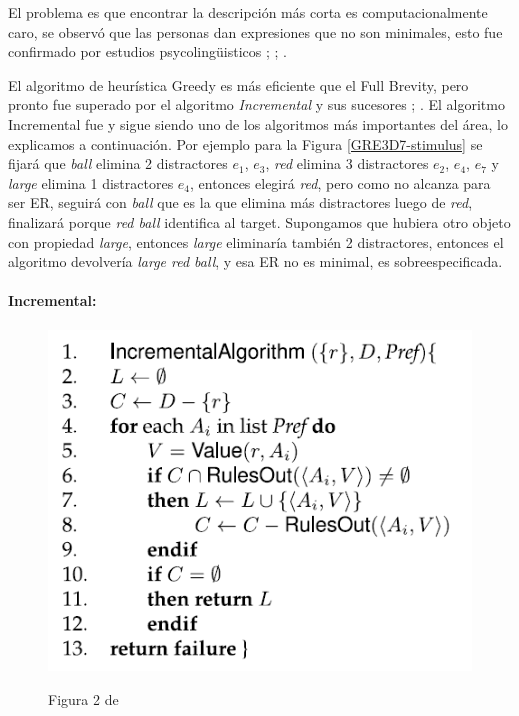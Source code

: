 El problema es que encontrar la descripci\'on m\'as corta es computacionalmente caro, se observ\'o que las personas dan expresiones que no son minimales, esto fue confirmado por estudios psycoling\"uisticos \cite{Olson1970LangAndThought};  \cite{Sonnenschein1984}; \cite{Pechmann1989}.

El algoritmo de heur\'istica Greedy es m\'as eficiente que el Full Brevity, pero pronto fue superado por el algoritmo {\it Incremental} y sus sucesores \cite{C92-1038}; \cite{Dale95computationalinterpretations}. El algoritmo Incremental fue y sigue siendo uno de los algoritmos m\'as importantes del \'area, lo explicamos a continuaci\'on. Por ejemplo para la Figura \ref{GRE3D7-stimulus} se fijar\'a que {\it ball} elimina 2 distractores {$e_{1}$, $e_{3}$}, {\it red} elimina 3 distractores {$e_{2}$, $e_{4}$, $e_{7}$} y {\it large} elimina 1 distractores {$e_{4}$}, entonces elegir\'a {\it red}, pero como no alcanza para ser ER, seguir\'a con {\it ball} que es la que elimina m\'as distractores luego de {\it red}, finalizar\'a porque {\it red ball} identifica al target. Supongamos que hubiera otro objeto con propiedad {\it large}, entonces {\it large} eliminar\'ia tambi\'en 2 distractores, entonces el algoritmo devolver\'ia {\it large red ball}, y esa ER no es minimal, es sobreespecificada.

\paragraph{Incremental:}

\begin{figure}[ht]
\includegraphics[width=.5\textwidth]{images/algoritmoIncremental.png}
\label{algoritmoIncremental}
\caption{Figura 2 de \protect\cite{survey}}
\end{figure}


